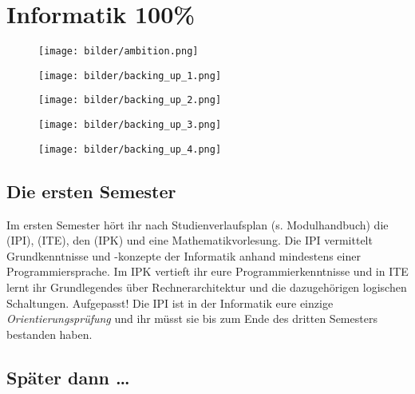 \section{Informatik 100\%}

\begin{figure}[b]
    \centering
    \texttt{[image: bilder/ambition.png]}
\end{figure}

\begin{figure*}[th]
    \centering
    \begin{subfigure}{.23\textwidth}
        \texttt{[image: bilder/backing\_up\_1.png]}
    \end{subfigure}
    \begin{subfigure}{.23\textwidth}
        \texttt{[image: bilder/backing\_up\_2.png]}
    \end{subfigure}
    \begin{subfigure}{.23\textwidth}
        \texttt{[image: bilder/backing\_up\_3.png]}
    \end{subfigure}
    \begin{subfigure}{.23\textwidth}
        \texttt{[image: bilder/backing\_up\_4.png]}
    \end{subfigure}
\end{figure*}

\subsection{Die ersten Semester}

Im ersten Semester hört ihr nach Studienverlaufsplan (s. Modulhandbuch) die  (\gls{IPI}),  (\gls{ITE}), den  (\gls{IPK}) und eine Mathematikvorlesung. Die \gls{IPI} vermittelt Grundkenntnisse und -konzepte der Informatik anhand mindestens einer Programmiersprache. Im \gls{IPK} vertieft ihr eure Programmierkenntnisse und in \gls{ITE} lernt ihr Grundlegendes über Rechnerarchitektur und die dazugehörigen logischen Schaltungen. Aufgepasst! Die \gls{IPI} ist in der Informatik eure einzige \emph{Orientierungsprüfung} und ihr müsst sie bis zum Ende des dritten Semesters bestanden haben.


\subsection{Später dann \dots{}}

